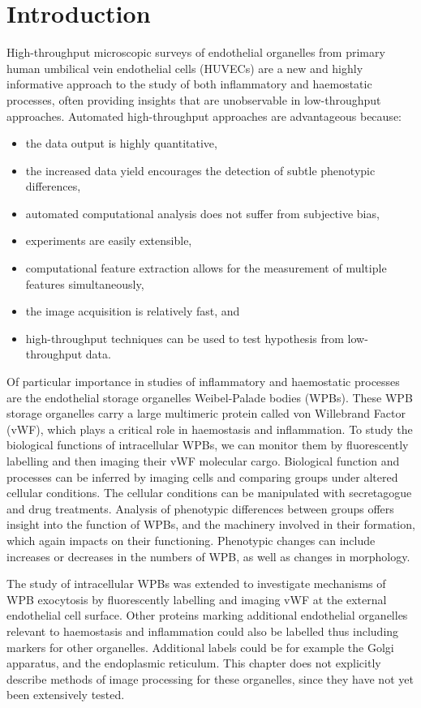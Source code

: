 \section{Introduction}
\label{endothelial_morphometry:introduction}
High-throughput microscopic surveys of endothelial organelles from primary human umbilical vein endothelial cells (HUVECs) are a new and highly informative approach to the study of both inflammatory and haemostatic processes, often providing insights that are unobservable in low-throughput approaches. Automated high-throughput approaches are advantageous because:
\begin{itemize}\setlength\itemsep{0pt}
	\item the data output is highly quantitative,
	\item the increased data yield encourages the detection of subtle phenotypic differences,
	\item automated computational analysis does not suffer from subjective bias,
	\item experiments are easily extensible,
	\item computational feature extraction allows for the measurement of multiple features simultaneously,
	\item the image acquisition is relatively fast, and
	\item high-throughput techniques can be used to test hypothesis from low-throughput data.
\end{itemize}

Of particular importance in studies of inflammatory and haemostatic processes are the endothelial storage organelles Weibel-Palade bodies (WPBs). These WPB storage organelles carry a large multimeric protein called von Willebrand Factor (vWF), which plays a critical role in haemostasis and inflammation. To study the biological functions of intracellular WPBs, we can monitor them by fluorescently labelling and then imaging their vWF molecular cargo. Biological function and processes can be inferred by imaging cells and comparing groups under altered cellular conditions. The cellular conditions can be manipulated with secretagogue and drug treatments. Analysis of phenotypic differences between groups offers insight into the function of WPBs, and the machinery involved in their formation, which again impacts on their functioning. Phenotypic changes can include increases or decreases in the numbers of WPB, as well as changes in morphology.


The study of intracellular WPBs was extended to investigate mechanisms of WPB exocytosis by fluorescently labelling and imaging vWF at the external endothelial cell surface. Other proteins marking additional endothelial organelles relevant to haemostasis and inflammation could also be labelled thus including markers for other organelles. Additional labels could be for example the Golgi apparatus, and the endoplasmic reticulum. This chapter does not explicitly describe methods of image processing for these organelles, since they have not yet been extensively tested.


